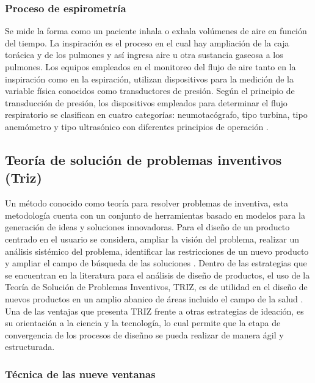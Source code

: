 \subsubsection{Proceso de espirometr\'ia}
Se mide la forma como un paciente inhala o exhala vol\'umenes de aire en funci\'on del tiempo. La inspiraci\'on es el proceso en el cual hay ampliaci\'on de la caja tor\'acica y de los pulmones y as\'i ingresa aire u otra sustancia gaseosa a los pulmones. Los equipos empleados en el monitoreo del flujo de aire tanto en la inspiraci\'on como en la espiraci\'on, utilizan dispositivos para la medici\'on de la variable f\'isica conocidos como transductores de presi\'on. Seg\'un el principio de transducci\'on de presi\'on, los dispositivos empleados para determinar el flujo respiratorio se clasifican en cuatro categor\'ias: neumotac\'ografo, tipo turbina, tipo anem\'ometro y tipo ultras\'onico con diferentes principios de operaci\'on \cite{17}. 


\subsection{Teor\'ia de soluci\'on de problemas inventivos (Triz)}

Un m\'etodo conocido como teor\'ia para resolver problemas de inventiva, esta metodolog\'ia cuenta con un conjunto de herramientas basado en modelos para la generaci\'on de ideas y soluciones innovadoras. Para el dise\~{n}o de un producto centrado en el usuario se considera, ampliar la visi\'on del problema, realizar un an\'alisis sist\'emico del problema, identificar las restricciones de un nuevo producto y ampliar el campo de b\'usqueda de las soluciones \cite{15}.  Dentro de las estrategias que se encuentran en la literatura para el an\'alisis de dise\~{n}o de productos, el uso de la Teor\'ia de Soluci\'on de Problemas Inventivos, TRIZ, es de utilidad en el dise\~{n}o de nuevos productos en un amplio abanico de \'areas incluido el campo de la salud \cite{16}.  Una de las ventajas que presenta TRIZ frente a otras estrategias de ideaci\'on, es su orientaci\'on a la ciencia y la tecnolog\'ia, lo cual permite que la etapa de convergencia de los procesos de dise\~{n}no se pueda realizar de manera \'agil y estructurada. \cite{17} 



\subsubsection{T\'ecnica de las nueve ventanas}

